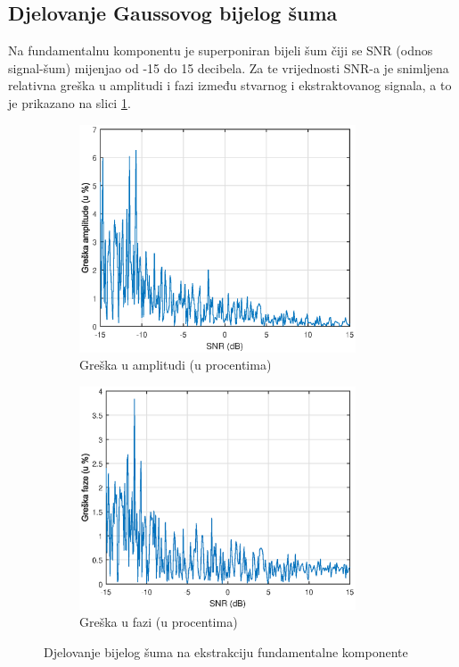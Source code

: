 \subsection{Djelovanje Gaussovog bijelog šuma}

Na fundamentalnu komponentu je superponiran bijeli šum čiji se SNR (odnos signal-šum) mijenjao od -15 do 15 decibela. Za te vrijednosti SNR-a je snimljena relativna greška u amplitudi i fazi između stvarnog i ekstraktovanog signala, a to je prikazano na slici \ref{fig:54}.


\begin{figure}[H]
    \centering
    \begin{subfigure}{0.45\textwidth}
        \centering
        \includegraphics[width=0.9\textwidth]{Slike_rezultati/Test_bs1.eps} %
        \caption{Greška u amplitudi (u procentima)}
    \end{subfigure}\hfill
    \begin{subfigure}{0.45\textwidth}
        \centering
        \includegraphics[width=0.9\textwidth]{Slike_rezultati/Test_bs2.eps} %
        \caption{Greška u fazi (u procentima)}
    \end{subfigure}
    \caption{Djelovanje bijelog šuma na ekstrakciju fundamentalne komponente }
    \label{fig:54}
\end{figure}

